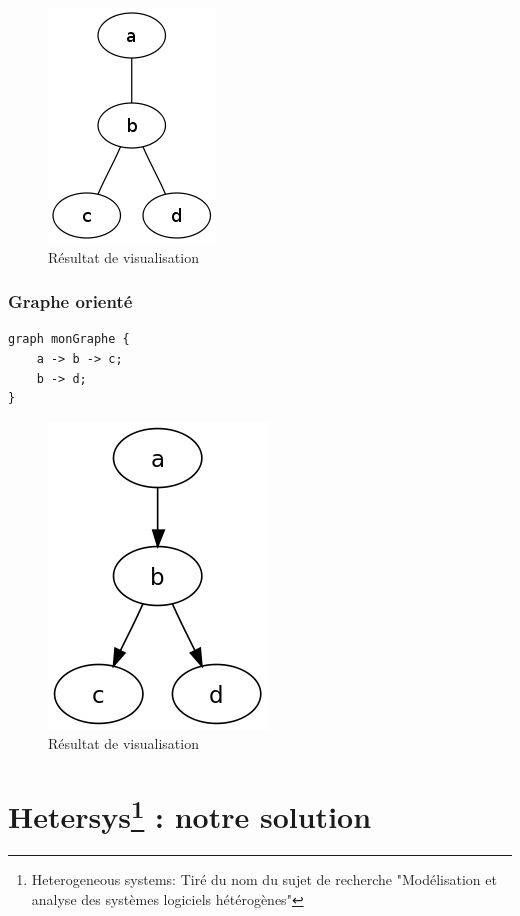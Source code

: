 \documentclass[12pt,a4paper]{report}
\begin{document}
\begin{figure}[!h]
  \centering
  \includegraphics[scale=0.3]{ressources/grapheNO.png}
  \caption{Résultat de visualisation}
\end{figure}

\subsection{Graphe orienté}

\begin{lstlisting}[caption=Description textuelle en DOT]
graph monGraphe {
    a -> b -> c;
    b -> d;
}
\end{lstlisting}

\begin{figure}[!h]
  \centering
  \includegraphics[scale=0.3]{ressources/grapheO.png}
  \caption{Résultat de visualisation}
\end{figure}

\newpage
\chapter[Hetersys : notre solution]{Hetersys\footnote{Heterogeneous systems: Tiré du nom du sujet de recherche "Modélisation et analyse des systèmes logiciels hétérogènes"} : notre solution}
\end{document}

